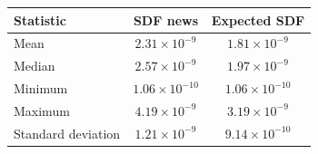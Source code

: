 \documentclass[11pt]{article}
\begin{document}
\begingroup
\fontsize{12.0pt}{14.4pt}\selectfont
\begin{tabular}{lcc}
\toprule
Statistic & SDF news & Expected SDF \\
\midrule
Mean & $2.31 \times 10^{-9}$ & $1.81 \times 10^{-9}$ \\
Median & $2.57 \times 10^{-9}$ & $1.97 \times 10^{-9}$ \\
Minimum & $1.06 \times 10^{-10}$ & $1.06 \times 10^{-10}$ \\
Maximum & $4.19 \times 10^{-9}$ & $3.19 \times 10^{-9}$ \\
Standard deviation & $1.21 \times 10^{-9}$ & $9.14 \times 10^{-10}$ \\
\bottomrule
\end{tabular}
\endgroup
\end{document}
